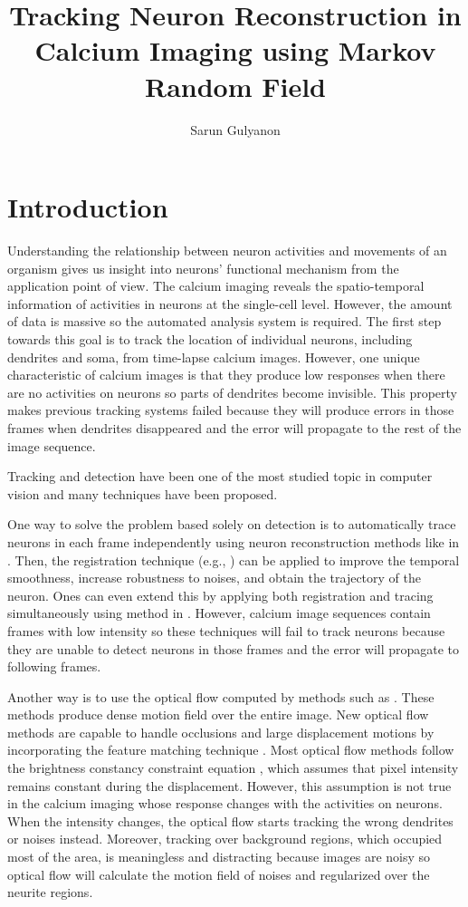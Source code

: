 \documentclass{article}
\author{Sarun Gulyanon}
\title{Tracking Neuron Reconstruction in Calcium Imaging using Markov Random Field }
\begin{document}
%
\maketitle

\section{Introduction}
Understanding the relationship between neuron activities and movements of an organism gives us insight into neurons' functional mechanism from the application point of view. The calcium imaging reveals the spatio-temporal information of activities in neurons at the single-cell level. However, the amount of data is massive so the automated analysis system is required. The first step towards this goal is to track the location of individual neurons, including dendrites and soma, from time-lapse calcium images. However, one unique characteristic of calcium images is that they produce low responses when there are no activities on neurons so parts of dendrites become invisible. This property makes previous tracking systems failed because they will produce errors in those frames when dendrites disappeared and the error will propagate to the rest of the image sequence. 

Tracking and detection have been one of the most studied topic in computer vision and many techniques have been proposed. 

One way to solve the problem based solely on detection is to automatically trace neurons in each frame independently using neuron reconstruction methods like in \cite{Gulyanon2015, Gulyanon2016}. Then, the registration technique (e.g., \cite{Farhand2016}) can be applied to improve the temporal smoothness, increase robustness to noises, and obtain the trajectory of the neuron. Ones can even extend this by applying both registration and tracing simultaneously using method in \cite{Glowacki2017}. However, calcium image sequences contain frames with low intensity so these techniques will fail to track neurons because they are unable to detect neurons in those frames and the error will propagate to following frames.

Another way is to use the optical flow computed by methods such as \cite{Chen2016, Bailer2017}. These methods produce dense motion field over the entire image. New optical flow methods are capable to handle occlusions and large displacement motions by incorporating the feature matching technique \cite{Bailer2017}. Most optical flow methods follow the brightness constancy constraint equation \cite{Fortun2015}, which assumes that pixel intensity remains constant during the displacement. However, this assumption is not true in the calcium imaging whose response changes with the activities on neurons. When the intensity changes, the optical flow starts tracking the wrong dendrites or noises instead. Moreover, tracking over background regions, which occupied most of the area, is meaningless and distracting because images are noisy so optical flow will calculate the motion field of noises and regularized over the neurite regions.
\end{document}

